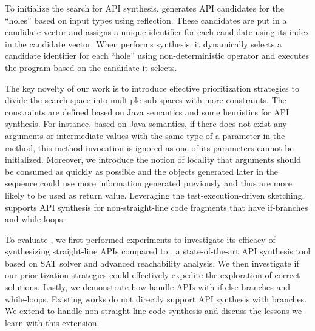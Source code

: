 To initialize the search for API synthesis, \tool generates API candidates for the ``holes'' based on input types using reflection. These candidates are put in a candidate vector and \tool assigns a unique identifier for each candidate using its index in the candidate vector.  When \tool performs synthesis, it dynamically selects a candidate identifier for each ``hole'' using non-deterministic   operator and executes the program based on the candidate it selects. 


The key novelty of our work is to introduce effective prioritization strategies to divide the search space into multiple sub-spaces with more constraints. The constraints are defined based on Java semantics and some heuristics for API synthesis. For instance, based on Java semantics,  if there does not exist any arguments or intermediate values with the same type of a parameter in the method, this method invocation is ignored as one of its parameters cannot be initialized. Moreover,  we introduce the notion of locality that arguments should be consumed as quickly as possible and the objects generated later in the sequence could use more information generated previously and thus are more likely to be used as return value. Leveraging the test-execution-driven sketching, \tool supports API synthesis for non-straight-line code fragments that have if-branches and while-loops. 


 
To evaluate \tool, we first performed experiments to investigate its efficacy of synthesizing straight-line APIs compared to \spt, a state-of-the-art API synthesis tool based on SAT solver and advanced reachability analysis. We then investigate if our prioritization strategies could effectively expedite  the exploration of correct solutions. Lastly, we demonstrate how \tool handle APIs with if-else-branches and while-loops.  Existing works  do not directly support API synthesis with branches. We extend \spt to handle non-straight-line code synthesis and discuss the lessons we learn with this extension.

